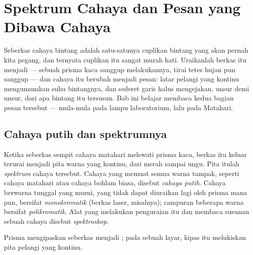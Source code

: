 \chapter{Spektrum Cahaya dan Pesan yang Dibawa Cahaya}\label{ch:g10:light-spectra}

Seberkas cahaya bintang adalah satu-satunya cuplikan bintang yang akan
pernah kita pegang, dan ternyata cuplikan itu sangat murah hati.
Uraikanlah berkas itu menjadi  --- sebuah prisma kaca
sanggup melakukannya, tirai tetes hujan pun sanggup --- dan cahaya itu
berubah menjadi pesan: latar pelangi yang kontinu mengumumkan suhu
bintangnya, dan sederet garis halus mengejakan, unsur demi unsur, dari
apa bintang itu tersusun. Bab ini belajar membaca kedua bagian pesan
tersebut --- mula-mula pada lampu laboratorium, lalu pada Matahari.

\section{Cahaya putih dan spektrumnya}

\begin{definition}\label{def:g10:light-spectra:white}
Ketika seberkas sempit cahaya matahari melewati prisma kaca, berkas itu
keluar terurai menjadi pita warna yang kontinu, dari merah sampai ungu.
Pita itulah \emph{spektrum} cahaya tersebut. Cahaya
yang memuat semua warna tampak, seperti cahaya matahari atau cahaya
bohlam biasa, disebut \emph{cahaya putih}. Cahaya
berwarna tunggal yang murni, yang tidak dapat diuraikan lagi oleh
prisma mana pun, bersifat
\emph{monokromatik} (berkas laser,
misalnya); campuran beberapa warna bersifat
\emph{polikromatik}. Alat yang melakukan
penguraian itu dan membaca susunan sebuah cahaya disebut
\emph{spektroskop}.
\end{definition}

\begin{omfigure}

{\small Prisma mengipaskan seberkas  menjadi ;
pada sebuah layar, kipas itu melukiskan pita pelangi yang kontinu.}
\end{omfigure}

